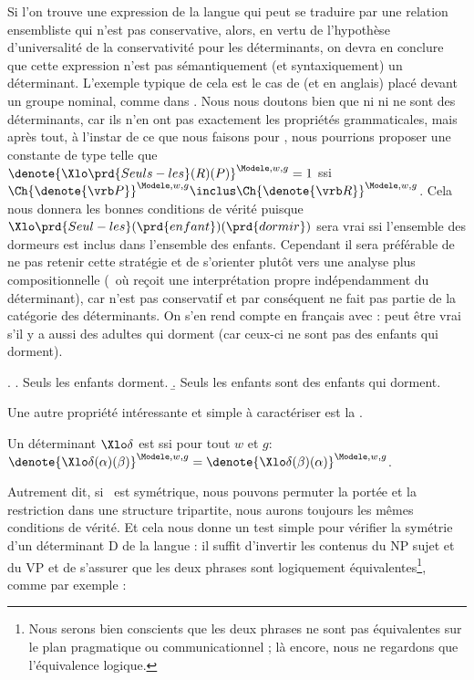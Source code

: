 Si l'on trouve une expression de la langue qui peut se traduire par une relation ensembliste qui n'est pas conservative, alors, en vertu de l'hypothèse d'universalité de la conservativité pour les déterminants, on devra en conclure que cette expression n'est pas sémantiquement (et syntaxiquement) un déterminant.
L'exemple typique de cela est le cas de  (et  en anglais) placé devant un groupe nominal, comme dans .
Nous nous doutons bien que ni  ni  ne sont des déterminants, car ils n'en ont pas exactement les propriétés grammaticales, mais après tout, à l'instar de ce que nous faisons pour , nous pourrions proposer une constante  de type \type{\et,\ett} telle que 
\(\denote{\Xlo\prd{Seuls-les}(R)(P)}^{\Modele,w,g}=1\) ssi
\(\Ch{\denote{\vrb P}}^{\Modele,w,g} \inclus \Ch{\denote{\vrb R}}^{\Modele,w,g}\).
Cela nous donnera les bonnes conditions de vérité puisque $\Xlo\prd{Seul-les}(\prd{enfant})(\prd{dormir})$ sera vrai ssi l'ensemble des dormeurs est inclus dans l'ensemble des enfants.
Cependant il sera préférable de ne pas retenir cette stratégie et de s'orienter plutôt vers une analyse plus compositionnelle (\ie\ où  reçoit une interprétation propre indépendamment du déterminant), car  n'est pas conservatif et par conséquent  ne fait pas partie de la catégorie des déterminants.  On s'en rend compte en français avec {\Next} : \Next[b] peut être vrai s'il y a aussi des adultes qui dorment (car ceux-ci ne sont pas des enfants qui dorment).

\fussy

\ex.
\a. Seuls les enfants dorment.
\b. Seuls les enfants sont des enfants qui dorment.



Une autre propriété intéressante et simple à caractériser est la .

\begin{defi}[Symétrie]
Un déterminant $\Xlo\delta$ est  ssi pour tout $w$ et $g$:\\ \(\denote{\Xlo\delta(\alpha)(\beta)}^{\Modele,w,g}=\denote{\Xlo\delta(\beta)(\alpha)}^{\Modele,w,g}\).
\end{defi}

\largerpage

Autrement dit, si \vrb\delta\ est symétrique, nous pouvons permuter la portée et la restriction dans une structure tripartite, nous aurons toujours les mêmes conditions de vérité.  Et cela nous donne un test simple pour vérifier la symétrie d'un déterminant D de la langue : il suffit d'invertir les contenus du NP sujet et du VP et de s'assurer que les deux phrases sont logiquement équivalentes\footnote{Nous serons bien conscients que les deux phrases ne sont pas équivalentes sur le plan pragmatique ou communicationnel ; là encore, nous ne regardons que l'équivalence logique.}, comme par exemple :

